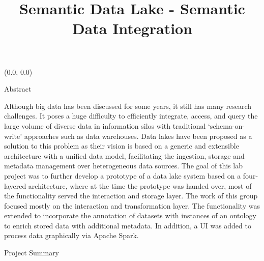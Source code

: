 \documentclass[12pt]{beamer}
\title{Semantic Data Lake - Semantic Data Integration}
\author{\hspace{0.5em}{\vphantom{Wy}A. Zaid, M. Fallou, T. Claas, M. Noman, S. Hoseini \\ Supervised by Prof. Dr. Quix and Dr. Lange-Bever}}
\begin{document}
	\begin{textblock}{0.5}(0.0, 0.0)
		
		\begin{block}{Abstract}
			
			\item Although big data has been discussed for some years, it still has many research challenges. It poses a huge difficulty to efficiently integrate, access, and query the large volume of diverse data in information silos with traditional ‘schema-on-write’ approaches such as data warehouses. Data lakes have been proposed as a solution to this problem as their vision is based on a generic and extensible architecture with a unified data model, facilitating the ingestion, storage and metadata management over heterogeneous data sources. The goal of this lab project was to further develop a prototype of a data lake system based on a four-layered architecture, where at the time the prototype was handed over, most of the functionality served the interaction and storage layer. The work of this group focused mostly on the interaction and transformation layer. The functionality was extended to incorporate the annotation of datasets with instances of an ontology to enrich stored data with additional metadata. In addition, a UI was added to process data graphically via Apache Spark.
		\end{block}
		
		\begin{block}{Project Summary}
			

\end{block}
\end{textblock}
\end{document}
